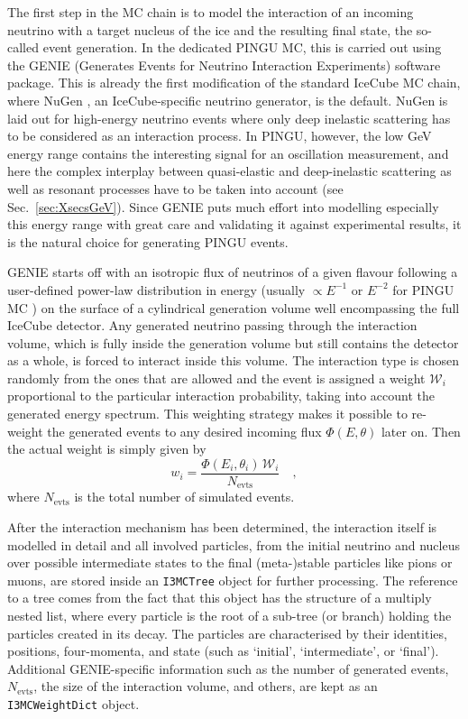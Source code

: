 The first step in the MC chain is to model the interaction of an incoming
neutrino with a target nucleus of the ice and the resulting final state, the
so-called
event generation. In the dedicated PINGU MC, this is carried out using the
GENIE (Generates Events for Neutrino Interaction Experiments) \cite{GENIE}
software package. This is already the first modification of the standard
IceCube MC chain, where NuGen \cite{NuGen}, an IceCube-specific neutrino
generator, is the default. NuGen is laid out for high-energy neutrino
events where only deep inelastic scattering has to be considered as an
interaction process. In PINGU, however, the low GeV energy range contains the
interesting signal for an oscillation measurement, and here the complex
interplay between
quasi-elastic and deep-inelastic scattering as well as resonant processes have
to be taken into account (see Sec.~\ref{sec:XsecsGeV}). Since GENIE puts much
effort into modelling especially this energy range with great care and
validating it against experimental results, it is the natural choice for
generating PINGU events.

GENIE starts off with an isotropic flux of neutrinos of a given flavour
following a user-defined power-law distribution in energy (usually $\propto
E^{-1}$ or $E^{-2}$ for PINGU MC \cite{PINGU_MC}) on the surface of a
cylindrical generation volume well encompassing the full IceCube detector. Any
generated neutrino passing through the interaction volume, which is fully inside
the generation volume but still contains the detector as a whole, is forced to
interact inside this volume. The interaction type is chosen randomly from the
ones that are allowed and the event is assigned a weight $\mathcal{W}_i$
proportional to the particular interaction probability, taking into account the
generated energy spectrum. This weighting strategy makes it possible to
re-weight the generated events to any desired incoming flux $\Phi(E, \theta)$
later on. Then the actual weight is simply given by
\begin{equation}
 w_i = \frac{\Phi(E_i, \theta_i)\,\mathcal{W}_i}{N_\mathrm{evts}} \quad,
 \label{eqn:reweight}
\end{equation}
where $N_\mathrm{evts}$ is the total number of simulated events.

After the interaction mechanism has been determined, the interaction itself is
modelled in detail and all involved particles, from the initial neutrino and
nucleus over possible intermediate states to the final (meta-)stable particles
like pions or muons, are stored inside an \texttt{I3MCTree} object for further
processing. The reference to a tree comes from the fact that this object has
the structure of a multiply nested list, where every particle is the root of a
sub-tree (or branch) holding the particles created in its decay. The particles
are characterised by their identities, positions, four-momenta, and state (such
as `initial', `intermediate', or `final').
Additional GENIE-specific information such as the number of generated events,
$N_\mathrm{evts}$, the size of the interaction volume, and others, are kept as
an \texttt{I3MCWeightDict} object.


